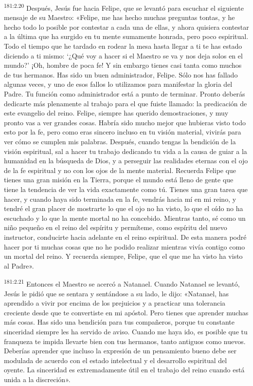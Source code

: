 \par 
\textsuperscript{181:2.20} Después, Jesús fue hacia Felipe, que se levantó para escuchar el siguiente mensaje de su Maestro: «Felipe, me has hecho muchas preguntas tontas, y he hecho todo lo posible por contestar a cada una de ellas, y ahora quisiera contestar a la última que ha surgido en tu mente sumamente honrada, pero poco espiritual. Todo el tiempo que he tardado en rodear la mesa hasta llegar a ti te has estado diciendo a ti mismo: `¿Qué voy a hacer si el Maestro se va y nos deja solos en el mundo?' ¡Oh, hombre de poca fe! Y sin embargo tienes casi tanta como muchos de tus hermanos. Has sido un buen administrador, Felipe. Sólo nos has fallado algunas veces, y uno de esos fallos lo utilizamos para manifestar la gloria del Padre. Tu función como administrador está a punto de terminar. Pronto deberás dedicarte más plenamente al trabajo para el que fuiste llamado: la predicación de este evangelio del reino. Felipe, siempre has querido demostraciones, y muy pronto vas a ver grandes cosas. Habría sido mucho mejor que hubieras visto todo esto por la fe, pero como eras sincero incluso en tu visión material, vivirás para ver cómo se cumplen mis palabras. Después, cuando tengas la bendición de la visión espiritual, sal a hacer tu trabajo dedicando tu vida a la causa de guiar a la humanidad en la búsqueda de Dios, y a perseguir las realidades eternas con el ojo de la fe espiritual y no con los ojos de la mente material. Recuerda Felipe que tienes una gran misión en la Tierra, porque el mundo está lleno de gente que tiene la tendencia de ver la vida exactamente como tú. Tienes una gran tarea que hacer, y cuando haya sido terminada en la fe, vendrás hacia mí en mi reino, y tendré el gran placer de mostrarte lo que el ojo no ha visto, lo que el oído no ha escuchado y lo que la mente mortal no ha concebido. Mientras tanto, sé como un niño pequeño en el reino del espíritu y permíteme, como espíritu del nuevo instructor, conducirte hacia adelante en el reino espiritual. De esta manera podré hacer por ti muchas cosas que no he podido realizar mientras vivía contigo como un mortal del reino. Y recuerda siempre, Felipe, que el que me ha visto ha visto al Padre».

\par 
\textsuperscript{181:2.21} Entonces el Maestro se acercó a Natanael. Cuando Natanael se levantó, Jesús le pidió que se sentara y sentándose a su lado, le dijo: «Natanael, has aprendido a vivir por encima de los prejuicios y a practicar una tolerancia creciente desde que te convertiste en mi apóstol. Pero tienes que aprender muchas más cosas. Has sido una bendición para tus compañeros, porque tu constante sinceridad siempre les ha servido de aviso. Cuando me haya ido, es posible que tu franqueza te impida llevarte bien con tus hermanos, tanto antiguos como nuevos. Deberías aprender que incluso la expresión de un pensamiento bueno debe ser modulada de acuerdo con el estado intelectual y el desarrollo espiritual del oyente. La sinceridad es extremadamente útil en el trabajo del reino cuando está unida a la discreción».

